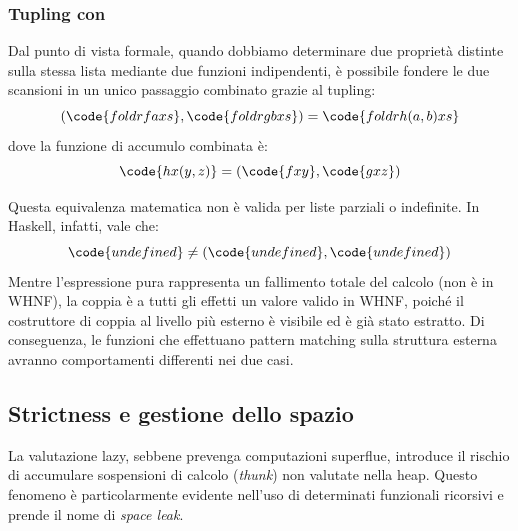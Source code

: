 \subsubsection{Tupling con }
Dal punto di vista formale, quando dobbiamo determinare due proprietà distinte sulla stessa lista mediante due funzioni  indipendenti, è possibile fondere le due scansioni in un unico passaggio combinato grazie al tupling:
\begin{equation*}
    (\code{foldr f a xs}, \code{foldr g b xs}) = \code{foldr h (a, b) xs}
\end{equation*}
dove la funzione di accumulo combinata  è:
\begin{equation*}
    \code{h x (y, z)} = (\code{f x y}, \code{g x z})
\end{equation*}

Questa equivalenza matematica non è valida per liste parziali o indefinite. In Haskell, infatti, vale che:
\begin{equation*}
    \code{undefined} \neq (\code{undefined}, \code{undefined})
\end{equation*}
Mentre l'espressione  pura rappresenta un fallimento totale del calcolo (non è in WHNF), la coppia  è a tutti gli effetti un valore valido in WHNF, poiché il costruttore di coppia \code{(,)} al livello più esterno è visibile ed è già stato estratto. Di conseguenza, le funzioni che effettuano pattern matching sulla struttura esterna avranno comportamenti differenti nei due casi.

\subsection{Strictness e gestione dello spazio}
La valutazione lazy, sebbene prevenga computazioni superflue, introduce il rischio di accumulare sospensioni di calcolo (\textit{thunk}) non valutate nella heap. Questo fenomeno è particolarmente evidente nell'uso di determinati funzionali ricorsivi e prende il nome di \textit{space leak}.

